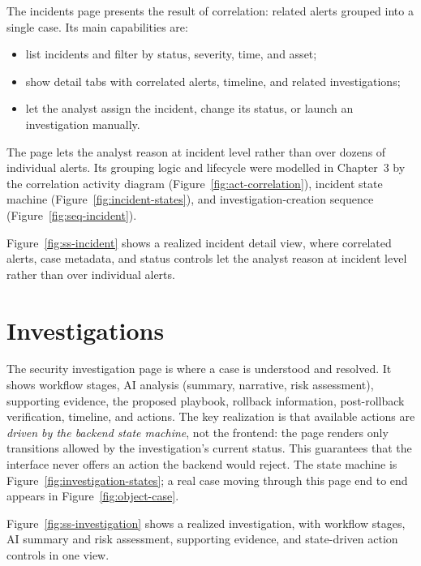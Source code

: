 The incidents page presents the result of correlation: related alerts grouped into a single case. Its main capabilities are:

\begin{itemize}[leftmargin=1cm]
\item list incidents and filter by status, severity, time, and asset;
\item show detail tabs with correlated alerts, timeline, and related investigations;
\item let the analyst assign the incident, change its status, or launch an investigation manually.
\end{itemize}

The page lets the analyst reason at incident level rather than over dozens of individual alerts. Its grouping logic and lifecycle were modelled in Chapter~3 by the correlation activity diagram (Figure~\ref{fig:act-correlation}), incident state machine (Figure~\ref{fig:incident-states}), and investigation-creation sequence (Figure~\ref{fig:seq-incident}).

Figure~\ref{fig:ss-incident} shows a realized incident detail view, where correlated alerts, case metadata, and status controls let the analyst reason at incident level rather than over individual alerts.


\section{Investigations}

The security investigation page is where a case is understood and resolved. It shows workflow stages, AI analysis (summary, narrative, risk assessment), supporting evidence, the proposed playbook, rollback information, post-rollback verification, timeline, and actions. The key realization is that available actions are \emph{driven by the backend state machine}, not the frontend: the page renders only transitions allowed by the investigation's current status. This guarantees that the interface never offers an action the backend would reject. The state machine is Figure~\ref{fig:investigation-states}; a real case moving through this page end to end appears in Figure~\ref{fig:object-case}.

Figure~\ref{fig:ss-investigation} shows a realized investigation, with workflow stages, AI summary and risk assessment, supporting evidence, and state-driven action controls in one view.


